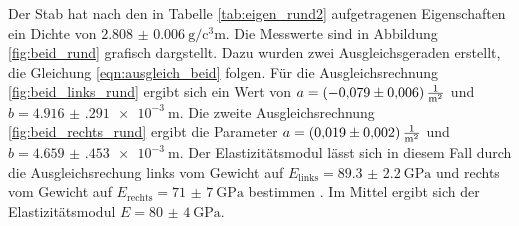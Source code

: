 Der Stab hat nach den in Tabelle \ref{tab:eigen_rund2} aufgetragenen Eigenschaften ein Dichte von $\SI{2.808(6)}{\gram\per\cubic\centi\meter}$.
Die Messwerte sind in Abbildung \ref{fig:beid_rund} grafisch dargstellt.
Dazu wurden zwei Ausgleichsgeraden erstellt, die Gleichung \eqref{eqn:ausgleich_beid} folgen.
Für die Ausgleichsrechnung \ref{fig:beid_links_rund} ergibt sich ein Wert von $a = \SI{-0.079(6)}{\frac{1}{\meter\squared}}$ und $b = \SI{4.916(291)e-3}{\meter}$.
Die zweite Ausgleichsrechnung \ref{fig:beid_rechts_rund} ergibt die Parameter $a = \SI{0.019(2)}{\frac{1}{\meter\squared}}$ und $b = \SI{4.659(453)e-3}{\meter}$.
Der Elastizitätsmodul lässt sich in diesem Fall durch die Ausgleichsrechung links vom Gewicht auf $E_\text{links} = \SI{89.3(22)}{\giga\pascal}$ und rechts vom Gewicht auf $E_\text{rechts} = \SI{71(7)}{\giga\pascal}$ bestimmen . 
Im Mittel ergibt sich der Elastizitätsmodul $E = \SI{80(4)}{\giga\pascal}$.

